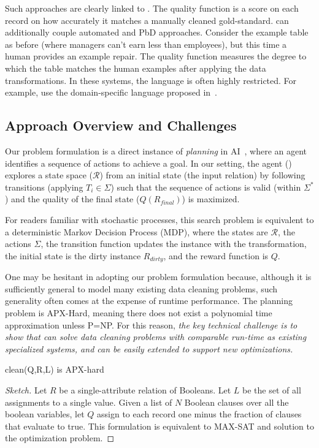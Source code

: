 Such approaches are clearly linked to \sys. The quality function is a score on each record on how accurately it matches a manually cleaned gold-standard. \sys can additionally couple automated and PbD approaches. 
Consider the example table as before (where managers can't earn less than employees), but this time  a human provides an example repair.
The quality function measures the degree to which the table matches the human examples after applying the data transformations.
In these systems, the language is often highly restricted.
For example, \cite{wrangler, jin2017foofah} use the domain-specific language proposed in~\cite{raman2001potter}.

\subsection{Approach Overview and Challenges}

Our problem formulation is a direct instance of {\it planning} in AI~\cite{russell1995modern}, where an agent identifies a sequence of actions to achieve a goal.  In our setting, the agent (\sys) explores a state space ($\mathcal{R}$) from an initial state (the input relation) by following transitions (applying $T_i \in \Sigma$) such that the sequence of actions is valid (within $\Sigma^*$) and the quality of the final state ($Q(R_{final})$) is maximized.  

For readers familiar with stochastic processes, this search problem is equivalent to a deterministic Markov Decision Process (MDP), where the states are $\mathcal{R}$, the actions $\Sigma$, the transition function updates the instance with the transformation, the initial state is the dirty instance $R_{dirty}$, and the reward function is $Q$.

One may be hesitant in adopting our problem formulation because, although it is sufficiently general to model many existing data cleaning problems, such generality often comes at the expense of runtime performance.   The planning problem is APX-Hard, meaning there does not exist a polynomial time approximation unless P=NP.  For this reason, {\it the key technical challenge is to show that \sys can solve data cleaning problems with comparable run-time as existing specialized systems, and can be easily extended to support new optimizations.}

\begin{theorem}[Hardness]
\textsf{clean}(Q,R,L) is APX-hard
\end{theorem}
\begin{proof}[Sketch]
Let $R$ be a single-attribute relation of Booleans. Let $L$ be the set of all assignments to a single value.
Given a list of $N$ Boolean clauses over all the boolean variables, let $Q$ assign to each record one minus the fraction of clauses that evaluate to true. This formulation is equivalent to MAX-SAT and solution to the optimization problem. 
\end{proof}

